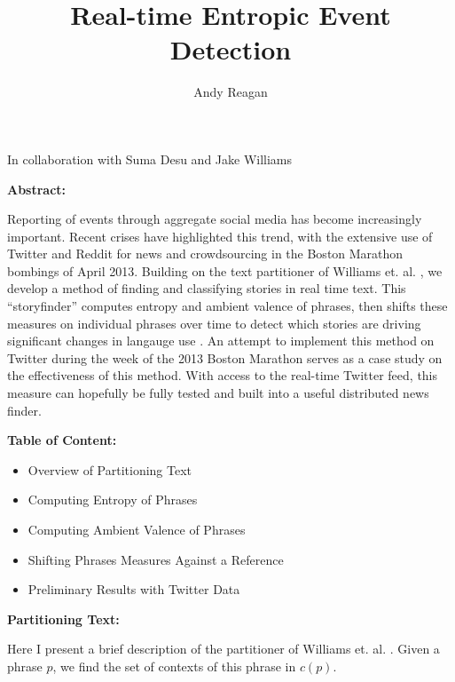 \documentclass[11pt]{article}
\author{Andy Reagan}
\title{Real-time Entropic Event Detection}
\begin{document}
\vspace{10cm}
\maketitle

\vspace{-10mm}
\begin{center}
\large{In collaboration with Suma Desu and Jake Williams}
\end{center}

\pagebreak

\textbf{Abstract:}

Reporting of events through aggregate social media has become increasingly important.
Recent crises have highlighted this trend, with the extensive use of Twitter and Reddit for news and crowdsourcing in the Boston Marathon bombings of April 2013.
Building on the text partitioner of Williams et. al. \cite{williams-partitioner}, we develop a method of finding and classifying stories in real time text.
This ``storyfinder'' computes entropy and ambient valence of phrases, then shifts these measures on individual phrases over time to detect which stories are driving significant changes in langauge use \cite{desu-ambient}.
An attempt to implement this method on Twitter during the week of the 2013 Boston Marathon serves as a case study on the effectiveness of this method.
With access to the real-time Twitter feed, this measure can hopefully be fully tested and built into a useful distributed news finder.

\pagebreak

\textbf{Table of Content:}

\begin{itemize}
\item Overview of Partitioning Text
\item Computing Entropy of Phrases
\item Computing Ambient Valence of Phrases
\item Shifting Phrases Measures Against a Reference
\item Preliminary Results with Twitter Data
\end{itemize}

\pagebreak

\textbf{Partitioning Text:}

Here I present a brief description of the partitioner of Williams et. al. \cite{williams-partitioner}.
Given a phrase $p$, we find the set of contexts of this phrase in $c(p)$.
\end{document}
